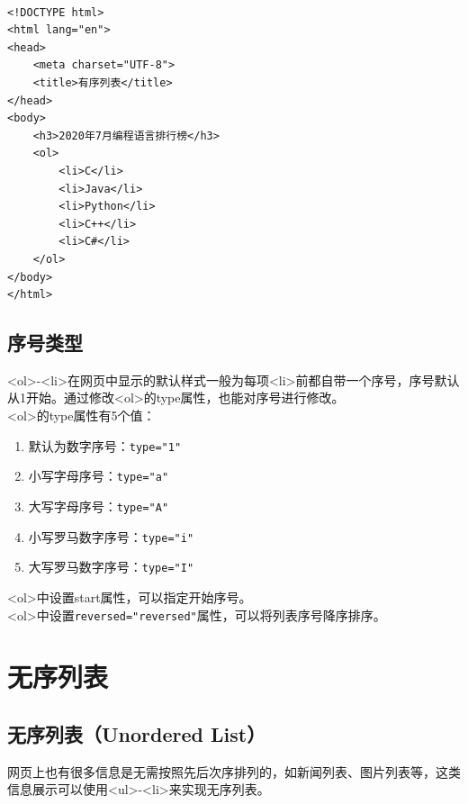 \vspace{0.5cm}

\\

\begin{lstlisting}[style=htmlcssjs]
<!DOCTYPE html>
<html lang="en">
<head>
    <meta charset="UTF-8">
    <title>有序列表</title>
</head>
<body>
    <h3>2020年7月编程语言排行榜</h3>
    <ol>
        <li>C</li>
        <li>Java</li>
        <li>Python</li>
        <li>C++</li>
        <li>C#</li>
    </ol>
</body>
</html>
\end{lstlisting}

\vspace{0.5cm}

\subsection{序号类型}

<ol>-<li>在网页中显示的默认样式一般为每项<li>前都自带一个序号，序号默认从1开始。通过修改<ol>的type属性，也能对序号进行修改。\\

<ol>的type属性有5个值：

\begin{enumerate}
	\item 默认为数字序号：\lstinline|type="1"|
	\item 小写字母序号：\lstinline|type="a"|
	\item 大写字母序号：\lstinline|type="A"|
	\item 小写罗马数字序号：\lstinline|type="i"|
	\item 大写罗马数字序号：\lstinline|type="I"|
\end{enumerate}

<ol>中设置start属性，可以指定开始序号。\\

<ol>中设置\lstinline|reversed="reversed"|属性，可以将列表序号降序排序。

\newpage

\section{无序列表}

\subsection{无序列表（Unordered List）}

网页上也有很多信息是无需按照先后次序排列的，如新闻列表、图片列表等，这类信息展示可以使用<ul>-<li>来实现无序列表。\\

